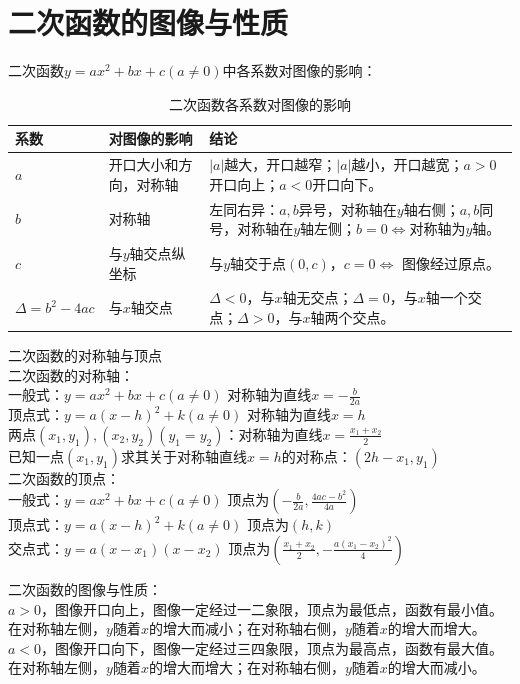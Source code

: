 \documentclass{ecnuthesis}
\begin{document}
\section{二次函数的图像与性质}
\begin{knowledge}
    二次函数$y=ax^2+bx+c(a\ne 0)$中各系数对图像的影响：
\end{knowledge}
\begin{table}[H]
\centering
\caption{二次函数各系数对图像的影响}
\begin{tabular}{l|l|p{8cm}}
\hline
\hline
系数 & 对图像的影响 & 结论 \\
\hline
$a$ & 开口大小和方向，对称轴 & $|a|$越大，开口越窄；$|a|$越小，开口越宽；$a>0$开口向上；$a<0$开口向下。 \\
$b$ & 对称轴 & 左同右异：$a,b$异号，对称轴在$y$轴右侧；$a,b$同号，对称轴在$y$轴左侧；$b=0\Leftrightarrow$对称轴为$y$轴。 \\
$c$ & 与$y$轴交点纵坐标 & 与$y$轴交于点$(0,c)$，$c=0\Leftrightarrow$ 图像经过原点。 \\
$\Delta=b^2-4ac$ & 与$x$轴交点 & $\Delta<0$，与$x$轴无交点；$\Delta=0$，与$x$轴一个交点；$\Delta>0$，与$x$轴两个交点。\\
\hline
\hline
\end{tabular}
\end{table}
\begin{knowledge}
    二次函数的对称轴与顶点 \\
    二次函数的对称轴：\\
    一般式：$y=ax^2+bx+c(a\ne 0)$ 对称轴为直线$x=-\frac{b}{2a}$ \\
    顶点式：$y=a(x-h)^2+k(a\ne 0)$ 对称轴为直线$x=h$ \\
    两点$(x_1,y_1),(x_2,y_2)(y_1=y_2)$：对称轴为直线$x=\frac{x_1+x_2}{2}$ \\
    已知一点$(x_1,y_1)$求其关于对称轴直线$x=h$的对称点：$(2h-x_1,y_1)$ \\
    二次函数的顶点： \\
    一般式：$y=ax^2+bx+c(a\ne 0)$ 顶点为$(-\frac{b}{2a},\frac{4ac-b^2}{4a})$ \\
    顶点式：$y=a(x-h)^2+k(a\ne 0)$ 顶点为$(h,k)$ \\
    交点式：$y=a(x-x_1)(x-x_2)$ 顶点为$(\frac{x_1+x_2}{2},-\frac{a(x_1-x_2)^2}{4})$
\end{knowledge}
\begin{knowledge}
    二次函数的图像与性质：\\
    $a>0$，图像开口向上，图像一定经过一二象限，顶点为最低点，函数有最小值。在对称轴左侧，$y$随着$x$的增大而减小；在对称轴右侧，$y$随着$x$的增大而增大。\\
    $a<0$，图像开口向下，图像一定经过三四象限，顶点为最高点，函数有最大值。在对称轴左侧，$y$随着$x$的增大而增大；在对称轴右侧，$y$随着$x$的增大而减小。
\end{knowledge}
\end{document}
